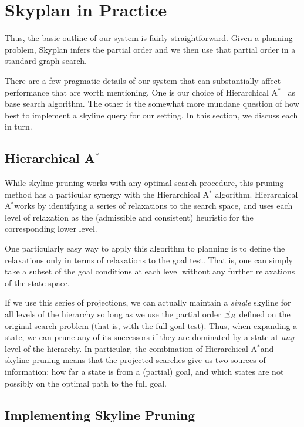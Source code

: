 \documentclass[letterpaper]{article}
\theoremstyle{plain} \newtheorem{theorem}{Theorem} \newtheorem{proposition}{Proposition} \newtheorem{lemma}{Lemma}
\theoremstyle{definition} \newtheorem{definition}{Definition} \newtheorem{conjecture}{Conjecture} \newtheorem*{example}{Example}
\theoremstyle{remark} \newtheorem*{remark}{Remark} \newtheorem*{note}{Note} \newtheorem{case}{Case}
\newcommand{\Astar}{A$^*$}
\begin{document}
\section{Skyplan in Practice}

Thus, the basic outline of our system is fairly straightforward.
Given a planning problem, Skyplan infers the partial order
and we then use that partial order in a standard graph search.

There are a few pragmatic details of our system that can substantially
affect performance that are worth mentioning. One is our choice of
Hierarchical \Astar~\citep{holte1996hierarchical} as base search
algorithm. The
other is the somewhat more mundane question of how best to implement
a skyline query for our setting.  In this section, we discuss each
in turn.

\subsection{Hierarchical \Astar}

While skyline pruning works with any optimal search procedure, this
pruning method has a particular synergy with the Hierarchical \Astar
algorithm. Hierarchical \Astar works
by identifying a series of relaxations to the search space, and
uses each level of relaxation as the (admissible and consistent)
heuristic for the corresponding lower level.

One particularly easy way to apply this algorithm to planning is
to define the relaxations only in terms of relaxations to the goal
test. That is, one can simply take a subset of the goal conditions
at each level without any further relaxations of the state space. 

If we use this series of projections, we can actually maintain a
\textit{single} skyline for all levels of the hierarchy so long as
we use the partial order $\preceq_R$ defined on the original search problem
(that is, with the full goal test). Thus, when expanding a 
state, we can prune any of its successors if they are dominated
by a state at \textit{any} level of the hierarchy.  In particular,
the combination of Hierarchical \Astar and skyline pruning means
that the projected searches give us two sources of information: how
far a state is from a (partial) goal, and which states are not
possibly on the optimal path to the full goal. 

\subsection{Implementing Skyline Pruning}
\end{document}

